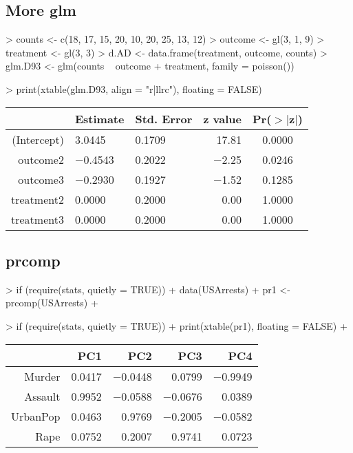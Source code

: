 \documentclass[letterpaper]{article}
\begin{document}
\subsection{More glm}
\begin{Schunk}
\begin{Sinput}
> counts <- c(18, 17, 15, 20, 10, 20, 25, 13, 12)
> outcome <- gl(3, 1, 9)
> treatment <- gl(3, 3)
> d.AD <- data.frame(treatment, outcome, counts)
> glm.D93 <- glm(counts ~ outcome + treatment, family = poisson())
\end{Sinput}
\end{Schunk}
\begin{Schunk}
\begin{Sinput}
> print(xtable(glm.D93, align = "r|llrc"), floating = FALSE)
\end{Sinput}
% latex table generated in R 2.6.0 by xtable 1.5-2 package
% Wed Oct 10 14:26:36 2007
\begin{tabular}{r|llrc}
  \hline
 & Estimate & Std. Error & z value & Pr($>$$|$z$|$) \\
  \hline
(Intercept) & 3.0445 & 0.1709 & 17.81 & 0.0000 \\
  outcome2 & $-$0.4543 & 0.2022 & $-$2.25 & 0.0246 \\
  outcome3 & $-$0.2930 & 0.1927 & $-$1.52 & 0.1285 \\
  treatment2 & 0.0000 & 0.2000 & 0.00 & 1.0000 \\
  treatment3 & 0.0000 & 0.2000 & 0.00 & 1.0000 \\
   \hline
\end{tabular}\end{Schunk}

\subsection{prcomp}
\begin{Schunk}
\begin{Sinput}
> if (require(stats, quietly = TRUE)) {
+     data(USArrests)
+     pr1 <- prcomp(USArrests)
+ }
\end{Sinput}
\end{Schunk}
\begin{Schunk}
\begin{Sinput}
> if (require(stats, quietly = TRUE)) {
+     print(xtable(pr1), floating = FALSE)
+ }
\end{Sinput}
% latex table generated in R 2.6.0 by xtable 1.5-2 package
% Wed Oct 10 14:26:36 2007
\begin{tabular}{rrrrr}
  \hline
 & PC1 & PC2 & PC3 & PC4 \\
  \hline
Murder & 0.0417 & $-$0.0448 & 0.0799 & $-$0.9949 \\
  Assault & 0.9952 & $-$0.0588 & $-$0.0676 & 0.0389 \\
  UrbanPop & 0.0463 & 0.9769 & $-$0.2005 & $-$0.0582 \\
  Rape & 0.0752 & 0.2007 & 0.9741 & 0.0723 \\
   \hline
\end{tabular}\end{Schunk}
\end{document}

